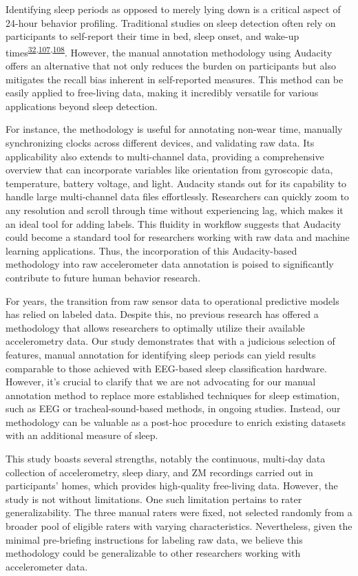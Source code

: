 \documentclass[
  9pt,
]{scrbook}
\begin{document}
Identifying sleep periods as opposed to merely lying down is a critical
aspect of 24-hour behavior profiling. Traditional studies on sleep
detection often rely on participants to self-report their time in bed,
sleep onset, and wake-up
times\textsuperscript{\protect\hyperlink{ref-girschik_validation_2012}{32},\protect\hyperlink{ref-littner_2003}{107},\protect\hyperlink{ref-lockley_1999}{108}}.
However, the manual annotation methodology using Audacity offers an
alternative that not only reduces the burden on participants but also
mitigates the recall bias inherent in self-reported measures. This
method can be easily applied to free-living data, making it incredibly
versatile for various applications beyond sleep detection.

For instance, the methodology is useful for annotating non-wear time,
manually synchronizing clocks across different devices, and validating
raw data. Its applicability also extends to multi-channel data,
providing a comprehensive overview that can incorporate variables like
orientation from gyroscopic data, temperature, battery voltage, and
light. Audacity stands out for its capability to handle large
multi-channel data files effortlessly. Researchers can quickly zoom to
any resolution and scroll through time without experiencing lag, which
makes it an ideal tool for adding labels. This fluidity in workflow
suggests that Audacity could become a standard tool for researchers
working with raw data and machine learning applications. Thus, the
incorporation of this Audacity-based methodology into raw accelerometer
data annotation is poised to significantly contribute to future human
behavior research.

For years, the transition from raw sensor data to operational predictive
models has relied on labeled data. Despite this, no previous research
has offered a methodology that allows researchers to optimally utilize
their available accelerometry data. Our study demonstrates that with a
judicious selection of features, manual annotation for identifying sleep
periods can yield results comparable to those achieved with EEG-based
sleep classification hardware. However, it's crucial to clarify that we
are not advocating for our manual annotation method to replace more
established techniques for sleep estimation, such as EEG or
tracheal-sound-based methods, in ongoing studies. Instead, our
methodology can be valuable as a post-hoc procedure to enrich existing
datasets with an additional measure of sleep.

This study boasts several strengths, notably the continuous, multi-day
data collection of accelerometry, sleep diary, and ZM recordings carried
out in participants' homes, which provides high-quality free-living
data. However, the study is not without limitations. One such limitation
pertains to rater generalizability. The three manual raters were fixed,
not selected randomly from a broader pool of eligible raters with
varying characteristics. Nevertheless, given the minimal pre-briefing
instructions for labeling raw data, we believe this methodology could be
generalizable to other researchers working with accelerometer data.
\end{document}
